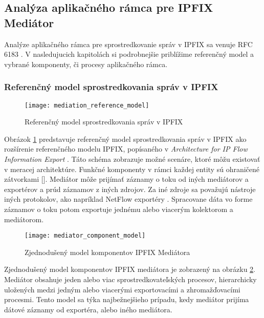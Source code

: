 \subsection{Analýza aplikačného rámca pre IPFIX Mediátor} \label{sec:framework}

Analýze aplikačného rámca pre sprostredkovanie správ v IPFIX sa venuje RFC 6183 \citep{rfc6183}. 
V nasledujucich kapitolách si podrobnejšie priblížime referenčný model a vybrané komponenty, či procesy 
aplikačného rámca.

\subsubsection{Referenčný model sprostredkovania správ v IPFIX}

\begin{figure}[ht!]
\centering
\texttt{[image: mediation\_reference\_model]}
\caption{Referenčný model sprostredkovania správ v IPFIX}\label{o:mediation_reference_model}
\end{figure}

Obrázok \ref{o:mediation_reference_model} predstavuje referenčný model sprostredkovania správ v IPFIX 
ako rozšírenie referenčného modelu IPFIX, popísaného v \emph{Architecture for IP Flow Information Export} 
\citep{rfc5470}. Táto schéma zobrazuje možné scenáre, ktoré môžu existovať v meracej architektúre.
Funkčné komponenty v rámci každej entity sú ohraničené zátvorkami []. Mediátor môže prijímať 
záznamy o toku od iných mediátorov a exportérov a prúd záznamov z iných zdrojov.
Za iné zdroje sa považujú nástroje iných protokolov, ako napríklad NetFlow exportéry \citep{rfc3954}. 
Spracovane dáta vo forme záznamov o toku potom exportuje jednému alebo viacerým kolektorom a mediátorom.

\begin{figure}[ht!]
\centering
\texttt{[image: mediator\_component\_model]}
\caption{Zjednodušený model komponentov IPFIX Mediátora}\label{o:mediator_component_model}
\end{figure}

Zjednodušený model komponentov IPFIX mediátora je zobrazený na obrázku \ref{o:mediator_component_model}. 
Mediátor obsahuje jeden alebo viac sprostredkovateľských procesov, hierarchicky uložených 
medzi jedným alebo viacerými exportovacími a zhromažďovacími procesmi. Tento model sa týka 
najbežnejšieho prípadu, kedy mediátor prijíma dátové záznamy od exportéra, alebo iného mediátora.


